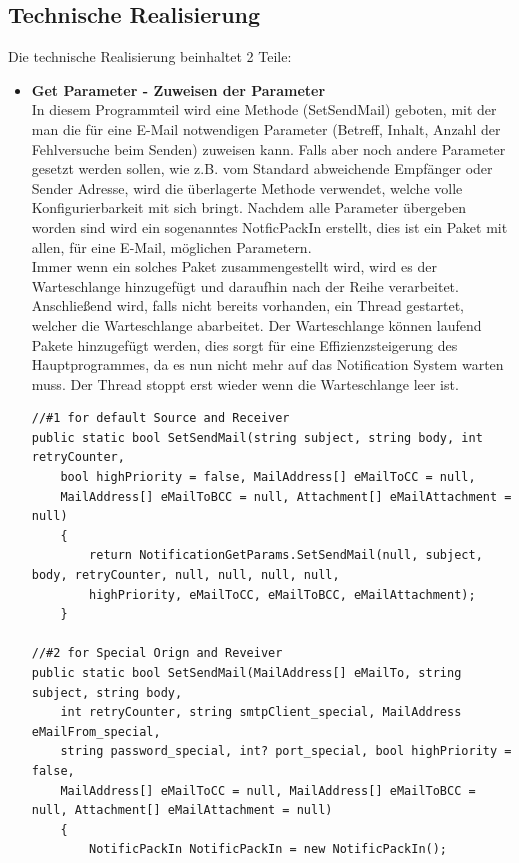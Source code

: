 \documentclass[12pt,a4paper]{report}
\begin{document}
\begin{onehalfspace}
\section{Technische Realisierung}
Die technische Realisierung beinhaltet 2 Teile:
\begin{itemize}
\item \textbf{Get Parameter - Zuweisen der Parameter}\\
In diesem Programmteil wird eine Methode (SetSendMail) geboten, mit der man die für eine E-Mail notwendigen Parameter (Betreff, Inhalt, Anzahl der Fehlversuche beim Senden) zuweisen kann. Falls aber noch andere Parameter gesetzt werden sollen, wie z.B. vom Standard abweichende Empfänger oder Sender Adresse, wird die überlagerte Methode verwendet, welche volle Konfigurierbarkeit mit sich bringt.
Nachdem alle Parameter übergeben worden sind wird ein sogenanntes NotficPackIn erstellt, dies ist ein Paket mit allen, für eine E-Mail, möglichen Parametern.\\
Immer wenn ein solches Paket zusammengestellt wird, wird es der Warteschlange hinzugefügt und daraufhin nach der Reihe verarbeitet.\\
Anschließend wird, falls nicht bereits vorhanden, ein Thread gestartet, welcher die Warteschlange abarbeitet. Der Warteschlange können laufend Pakete hinzugefügt werden, dies sorgt für eine Effizienzsteigerung des Hauptprogrammes, da es nun nicht mehr auf das Notification System warten muss. Der Thread stoppt erst wieder wenn die Warteschlange leer ist.\\

\begin{lstlisting}
//#1 for default Source and Receiver
public static bool SetSendMail(string subject, string body, int retryCounter,
	bool highPriority = false, MailAddress[] eMailToCC = null, 
    MailAddress[] eMailToBCC = null, Attachment[] eMailAttachment = null)
    {
    	return NotificationGetParams.SetSendMail(null, subject, body, retryCounter, null, null, null, null,
        highPriority, eMailToCC, eMailToBCC, eMailAttachment);
    } 
        
//#2 for Special Orign and Reveiver
public static bool SetSendMail(MailAddress[] eMailTo, string subject, string body, 
	int retryCounter, string smtpClient_special, MailAddress eMailFrom_special, 
    string password_special, int? port_special, bool highPriority = false, 
    MailAddress[] eMailToCC = null, MailAddress[] eMailToBCC = null, Attachment[] eMailAttachment = null)
    {
    	NotificPackIn NotificPackIn = new NotificPackIn();


\end{lstlisting}
\end{itemize}
\end{onehalfspace}
\end{document}
